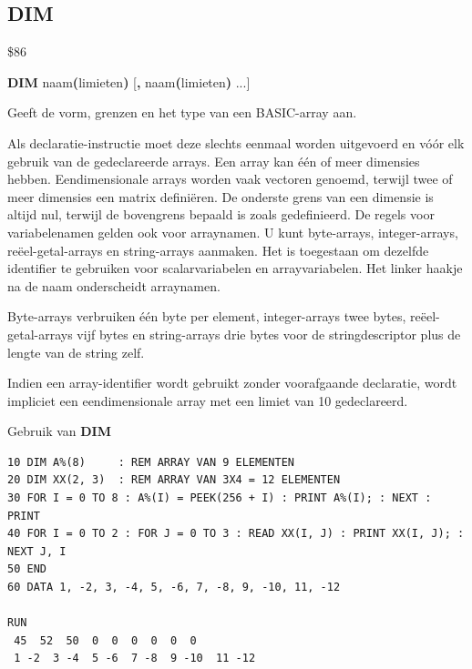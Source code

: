 
\newpage
\subsection{DIM}
\begin{description}[leftmargin=2cm,style=nextline]
\item [Token:]   \$86

\item [Formaat:]  {\bf DIM} naam{\bf(}limieten{\bf)} [{\bf,} naam{\bf(}limieten{\bf)} ...]

\item [Gebruik:]   Geeft de vorm, grenzen en het type van een BASIC-array aan.

                 Als declaratie-instructie moet deze slechts eenmaal worden uitgevoerd en vóór elk gebruik van de gedeclareerde arrays. Een array kan één of meer dimensies hebben. Eendimensionale arrays worden vaak vectoren genoemd, terwijl twee of meer dimensies een matrix definiëren. De onderste grens van een dimensie is altijd nul, terwijl de bovengrens bepaald is zoals gedefinieerd. De regels voor variabelenamen gelden ook voor arraynamen. U kunt byte-arrays, integer-arrays, reëel-getal-arrays en string-arrays aanmaken. Het is toegestaan om dezelfde identifier te gebruiken voor scalarvariabelen en arrayvariabelen. Het linker haakje na de naam onderscheidt arraynamen.

\item [Opmerkingen:] Byte-arrays verbruiken één byte per element, integer-arrays twee bytes, reëel-getal-arrays vijf bytes en string-arrays drie bytes voor de stringdescriptor plus de lengte van de string zelf.

                 Indien een array-identifier wordt gebruikt zonder voorafgaande declaratie, wordt impliciet een eendimensionale array met een limiet van 10 gedeclareerd.

\item [Voorbeeld:] Gebruik van {\bf DIM}

\begin{tcolorbox}[colback=black,coltext=white]
\verbatimfont{\codefont}
\begin{verbatim}
10 DIM A%(8)     : REM ARRAY VAN 9 ELEMENTEN
20 DIM XX(2, 3)  : REM ARRAY VAN 3X4 = 12 ELEMENTEN
30 FOR I = 0 TO 8 : A%(I) = PEEK(256 + I) : PRINT A%(I); : NEXT : PRINT
40 FOR I = 0 TO 2 : FOR J = 0 TO 3 : READ XX(I, J) : PRINT XX(I, J); : NEXT J, I
50 END
60 DATA 1, -2, 3, -4, 5, -6, 7, -8, 9, -10, 11, -12

RUN
 45  52  50  0  0  0  0  0  0
 1 -2  3 -4  5 -6  7 -8  9 -10  11 -12
\end{verbatim}
\end{tcolorbox}
\end{description}

